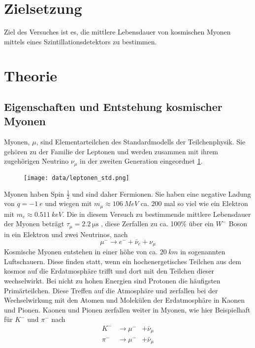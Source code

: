 \section{Zielsetzung}
\label{sec:Zielsetzung}
Ziel des Versuches ist es, die mittlere Lebensdauer von kosmischen Myonen mittels eines Szintillationsdetektors zu bestimmen. 

\section{Theorie}
\label{sec:Theorie}
\subsection{Eigenschaften und Entstehung kosmischer Myonen}
Myonen, $\mu$, sind Elementarteilchen des Standardmodells der Teilchenphysik. Sie gehören zu der Familie der Leptonen und werden zusammen mit ihrem zugehörigen Neutrino $\nu_\mu$ in der zweiten Generation eingeordnet \ref{fig:std}.
\begin{figure}[H]
    \centering
    \texttt{[image: data/leptonen\_std.png]}
    \label{fig:std}
\end{figure}
\noindent
Myonen haben Spin $\frac{1}{2}$ und sind daher Fermionen. Sie haben eine negative Ladung von $q = \SI{-1}{e}$ und wiegen mit $m_\mu \approx \SI{106}{MeV}$ ca. $200$ mal so viel wie ein Elektron mit $m_e \approx \SI{0.511}{keV}$. Die in diesem Versuch zu bestimmende mittlere Lebensdauer der Myonen beträgt $\tau_{\mu} = \SI{2.2}{\micro\second}$ \cite{pdg}, diese Zerfallen zu ca. 100\% \cite{pdg} über ein $W^{-}$ Boson in ein Elektron und zwei Neutrinos, nach 
\begin{equation}
    \mu^- \rightarrow e^- + \bar{\nu}_e + \nu_\mu
\end{equation}
Kosmische Myonen entstehen in einer höhe von ca. $\SI{20}{km}$ in sogenannten Luftschauern. Diese finden statt, wenn ein hochenergetisches Teilchen aus dem kosmos auf die Erdatmosphäre trifft und dort mit den Teilchen dieser wechselwirkt.
Bei nicht zu hohen Energien sind Protonen die häufigsten Primärteilchen. Diese Treffen auf die Atmosphäre und zerfallen bei der Wechselwirkung mit den Atomen und Molekülen der Erdatmosphäre in Kaonen und Pionen. Kaonen und Pionen zerfallen weiter in Myonen, wie hier Beispielhaft für $K^-$ und $\pi^-$ nach
\begin{equation}
    \begin{aligned}
        K^- &\rightarrow \mu^- &+ \bar{\nu}_\mu \\
        \pi^- &\rightarrow \mu^- &+ \bar{\nu}_\mu
    \end{aligned}
\end{equation}

